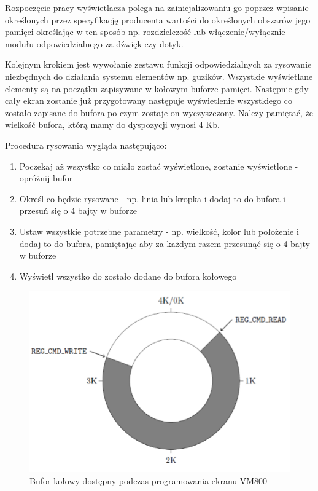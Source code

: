 \documentclass{xmgr}
\begin{document}
Rozpoczęcie pracy wyświetlacza polega na zainicjalizowaniu go poprzez wpisanie określonych przez specyfikację producenta wartości do określonych obszarów jego pamięci określając w ten sposób np. rozdzielczość lub włączenie/wyłącznie modułu odpowiedzialnego za dźwięk czy dotyk. 

Kolejnym krokiem jest wywołanie zestawu funkcji odpowiedzialnych za rysowanie niezbędnych do działania systemu elementów np. guzików. Wszystkie wyświetlane elementy są na początku zapisywane w kołowym buforze pamięci. Następnie gdy cały ekran zostanie już przygotowany następuje wyświetlenie wszystkiego co zostało zapisane do bufora po czym zostaje on wyczyszczony. Należy pamiętać, że wielkość bufora, którą mamy do dyspozycji wynosi 4 Kb.

Procedura rysowania wygląda następująco:
\begin{enumerate}
	\item Poczekaj aż wszystko co miało zostać wyświetlone, zostanie wyświetlone - opróżnij bufor
	\item Określ co będzie rysowane - np. linia lub kropka i dodaj to do bufora i przesuń się o 4 bajty w buforze
	\item Ustaw wszystkie potrzebne parametry - np. wielkość, kolor lub położenie i dodaj to do bufora, pamiętając aby za każdym razem przesunąć się o 4 bajty w buforze
	\item Wyświetl wszystko do zostało dodane do bufora kołowego 
\end{enumerate}

\begin{figure}[!h]
    \centering
    \includegraphics[height=0.25\textheight]{images/buf.png}
    \caption{Bufor kołowy dostępny podczas programowania ekranu VM800}
\end{figure}
\end{document}
